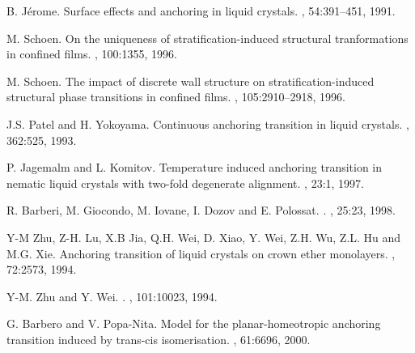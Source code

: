 \documentclass[aps,10pt,twocolumn]{revtex4}
\newcommand{\linespacing}[1]{\renewcommand{\baselinestretch}{#1}\large\normalsize}
\begin{document}
\linespacing{1.0}

\begin{thebibliography}{10}

{B. J\'erome}.
\newblock Surface effects and anchoring in liquid crystals.
, 54:391--451, 1991.

{M. Schoen}.
\newblock On the uniqueness of stratification-induced structural tranformations
  in confined films.
, 100:1355, 1996.

{M. Schoen}.
\newblock The impact of discrete wall structure on stratification-induced
  structural phase transitions in confined films.
, 105:2910--2918, 1996.

{J.S. Patel and H. Yokoyama}.
\newblock Continuous anchoring transition in liquid crystals.
, 362:525, 1993.

{P. Jagemalm and L. Komitov}.
\newblock Temperature induced anchoring transition in nematic liquid crystals
  with two-fold degenerate alignment.
, 23:1, 1997.

{R. Barberi, M. Giocondo, M. Iovane, I. Dozov and E. Polossat}.
.
, 25:23, 1998.

{Y-M Zhu, Z-H. Lu, X.B Jia, Q.H. Wei, D. Xiao, Y. Wei, Z.H. Wu, Z.L. Hu and
  M.G. Xie}.
\newblock Anchoring transition of liquid crystals on crown ether monolayers.
, 72:2573, 1994.

{Y-M. Zhu and Y. Wei}.
.
, 101:10023, 1994.

{G. Barbero and V. Popa-Nita}.
\newblock Model for the planar-homeotropic anchoring transition induced by
  trans-cis isomerisation.
, 61:6696, 2000.


\end{thebibliography}
\end{document}
